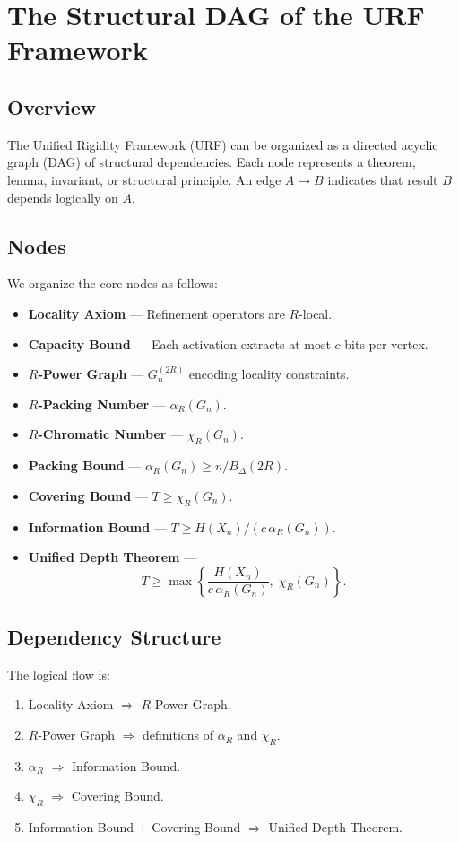 \chapter{The Structural DAG of the URF Framework}

\section{Overview}

The Unified Rigidity Framework (URF) can be organized as a directed acyclic graph (DAG) of structural dependencies.  
Each node represents a theorem, lemma, invariant, or structural principle.  
An edge $A \to B$ indicates that result $B$ depends logically on $A$.

\section{Nodes}

We organize the core nodes as follows:

\begin{itemize}
\item \textbf{Locality Axiom} — Refinement operators are $R$-local.
\item \textbf{Capacity Bound} — Each activation extracts at most $c$ bits per vertex.
\item \textbf{$R$-Power Graph} — $G_n^{(2R)}$ encoding locality constraints.
\item \textbf{$R$-Packing Number} — $\alpha_R(G_n)$.
\item \textbf{$R$-Chromatic Number} — $\chi_R(G_n)$.
\item \textbf{Packing Bound} — $\alpha_R(G_n) \ge n/B_\Delta(2R)$.
\item \textbf{Covering Bound} — $T \ge \chi_R(G_n)$.
\item \textbf{Information Bound} — $T \ge H(X_n)/(c\,\alpha_R(G_n))$.
\item \textbf{Unified Depth Theorem} — 
\[
T \ge \max\!\left\{
\frac{H(X_n)}{c\,\alpha_R(G_n)},
\;
\chi_R(G_n)
\right\}.
\]
\end{itemize}

\section{Dependency Structure}

The logical flow is:

\begin{enumerate}
\item Locality Axiom $\Rightarrow$ $R$-Power Graph.
\item $R$-Power Graph $\Rightarrow$ definitions of $\alpha_R$ and $\chi_R$.
\item $\alpha_R$ $\Rightarrow$ Information Bound.
\item $\chi_R$ $\Rightarrow$ Covering Bound.
\item Information Bound + Covering Bound $\Rightarrow$ Unified Depth Theorem.
\end{enumerate}

